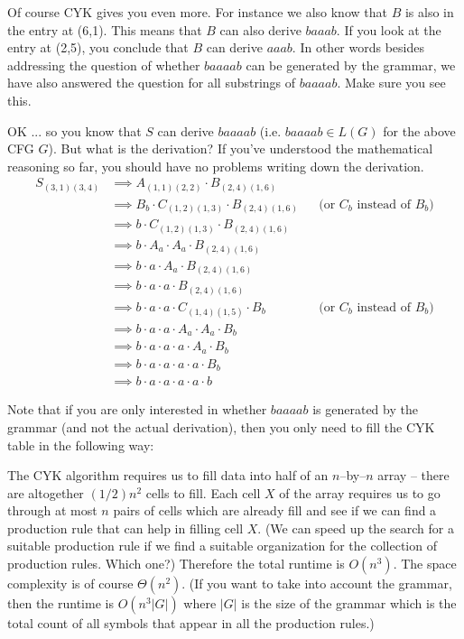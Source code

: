 Of course CYK gives you even more.
For instance we also know that $B$ is also in the entry at (6,1).
This means that $B$ can also derive $baaab$.
If you look at the entry at (2,5), you conclude that $B$ can derive $aaab$.
In other words besides addressing the question of whether $baaaab$ can be
generated by the grammar, we have also answered the question for all
substrings of $baaaab$.
Make sure you see this.

OK ... so you know that $S$ can derive $baaaab$ (i.e.
$baaaab \in L(G)$ for the above CFG $G$).
But what is the derivation?
If you've understood the mathematical reasoning so far,
you should have no problems writing down the derivation.
\newcommand\ddd{&\implies}
\begin{align*}
  S_{(3,1)(3,4)}
  &\implies A_{(1,1)(2,2)} \cdot B_{(2,4)(1,6)} \\
  &\implies B_b \cdot C_{(1,2)(1,3)} \cdot B_{(2,4)(1,6)} & & \text{(or $C_b$ instead of $B_b$)} \\
  &\implies b \cdot C_{(1,2)(1,3)} \cdot B_{(2,4)(1,6)} \\
  &\implies b \cdot A_a \cdot A_a \cdot B_{(2,4)(1,6)} \\
  &\implies b \cdot a \cdot A_a \cdot B_{(2,4)(1,6)} \\
  &\implies b \cdot a \cdot a \cdot B_{(2,4)(1,6)} \\
  &\implies b \cdot a \cdot a \cdot C_{(1,4)(1,5)} \cdot B_b & &  \text{(or $C_b$ instead of $B_b$)} \\
  &\implies b \cdot a \cdot a \cdot A_a \cdot A_a \cdot B_b \\
  &\implies b \cdot a \cdot a \cdot a \cdot A_a \cdot B_b \\
  &\implies b \cdot a \cdot a \cdot a \cdot a \cdot B_b \\
  &\implies b \cdot a \cdot a \cdot a \cdot a \cdot b
\end{align*}

Note that if you are only interested in whether $baaaab$ is generated by the grammar
(and not the actual derivation), then you only need to fill the CYK table in
the following way:


The CYK algorithm requires us to fill data into half of an $n$--by--$n$
array -- there are altogether $(1/2)n^2$ cells to fill.
Each cell $X$ of the array requires us to go through at most $n$ pairs
of cells which are already fill and see if we can find a production rule
that can help in filling cell $X$.
(We can speed up the search for a suitable production rule
if we find a suitable organization for the collection
of production rules. Which one?)
Therefore the total runtime is $O(n^3)$.
The space complexity is of course $\Theta(n^2)$.
(If you want to take into account the grammar, then the runtime is
$O(n^3 |G|)$ where $|G|$ is the size of the grammar
which is the total count of all symbols that appear
in all the production rules.)

